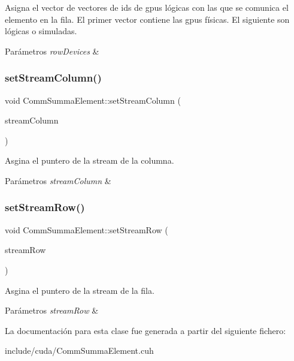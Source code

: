 Asigna el vector de vectores de ids de gpus lógicas con las que se comunica el elemento en la fila. El primer vector contiene las gpus físicas. El siguiente son lógicas o simuladas. 


\begin{DoxyParams}{Parámetros}
{\em row\+Devices} & \\
\hline
\end{DoxyParams}
\mbox{\label{classCommSummaElement_a388514818c690e6ac003d1bfa31d74b3}} 
\subsubsection{\texorpdfstring{set\+Stream\+Column()}{setStreamColumn()}}
{\footnotesize\ttfamily void Comm\+Summa\+Element\+::set\+Stream\+Column (\begin{DoxyParamCaption}\item[{cuda\+Stream\+\_\+t $\ast$}]{stream\+Column }\end{DoxyParamCaption})}



Asgina el puntero de la stream de la columna. 


\begin{DoxyParams}{Parámetros}
{\em stream\+Column} & \\
\hline
\end{DoxyParams}
\mbox{\label{classCommSummaElement_a098bfdc0e37966989b9291dec82a3271}} 
\subsubsection{\texorpdfstring{set\+Stream\+Row()}{setStreamRow()}}
{\footnotesize\ttfamily void Comm\+Summa\+Element\+::set\+Stream\+Row (\begin{DoxyParamCaption}\item[{cuda\+Stream\+\_\+t $\ast$}]{stream\+Row }\end{DoxyParamCaption})}



Asgina el puntero de la stream de la fila. 


\begin{DoxyParams}{Parámetros}
{\em stream\+Row} & \\
\hline
\end{DoxyParams}


La documentación para esta clase fue generada a partir del siguiente fichero\+:\begin{DoxyCompactItemize}
\item 
include/cuda/Comm\+Summa\+Element.\+cuh\end{DoxyCompactItemize}

